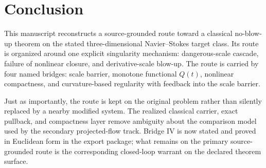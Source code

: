 \section{Conclusion}

This manuscript reconstructs a source-grounded route toward a classical no-blow-up theorem on the stated three-dimensional Navier--Stokes target class. Its route is organized around one explicit singularity mechanism: dangerous-scale cascade, failure of nonlinear closure, and derivative-scale blow-up. The route is carried by four named bridges: scale barrier, monotone functional \(Q(t)\), nonlinear compactness, and curvature-based regularity with feedback into the scale barrier.

Just as importantly, the route is kept on the original problem rather than
silently replaced by a nearby modified system. The realized classical carrier,
exact pullback, and compactness layer remove ambiguity about the comparison
model used by the secondary projected-flow track. Bridge IV is now stated and
proved in Euclidean form in the export package; what remains on the primary
source-grounded route is the corresponding closed-loop warrant on the declared
theorem surface.

